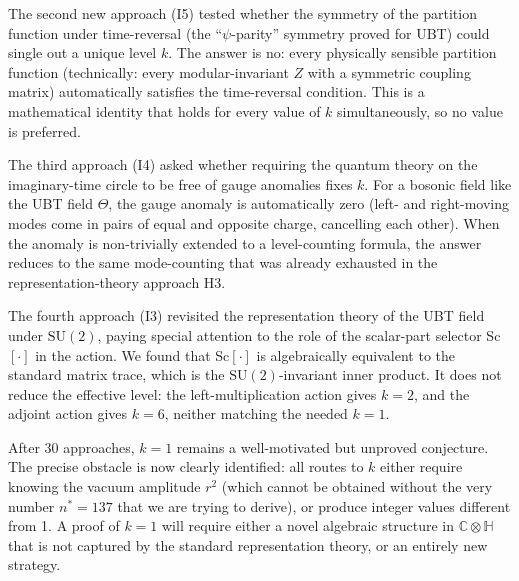 \documentclass[11pt,a4paper]{article}
\theoremstyle{definition}
\theoremstyle{remark}
\begin{document}
The second new approach (I5) tested whether the symmetry of the
partition function under time-reversal (the ``$\psi$-parity'' symmetry
proved for UBT) could single out a unique level $k$.
The answer is no: every physically sensible partition function
(technically: every modular-invariant $Z$ with a symmetric coupling
matrix) automatically satisfies the time-reversal condition.
This is a mathematical identity that holds for every value of $k$
simultaneously, so no value is preferred.

The third approach (I4) asked whether requiring the quantum theory on
the imaginary-time circle to be free of gauge anomalies fixes $k$.
For a bosonic field like the UBT field $\Theta$, the gauge anomaly
is automatically zero (left- and right-moving modes come in pairs
of equal and opposite charge, cancelling each other).
When the anomaly is non-trivially extended to a level-counting
formula, the answer reduces to the same mode-counting that was already
exhausted in the representation-theory approach H3.

The fourth approach (I3) revisited the representation theory of the
UBT field under $\mathrm{SU}(2)$, paying special attention to the
role of the scalar-part selector Sc$[\cdot]$ in the action.
We found that Sc$[\cdot]$ is algebraically equivalent to the standard
matrix trace, which is the $\mathrm{SU}(2)$-invariant inner product.
It does not reduce the effective level: the left-multiplication
action gives $k = 2$, and the adjoint action gives $k = 6$,
neither matching the needed $k = 1$.

After 30 approaches, $k = 1$ remains a well-motivated but unproved
conjecture.
The precise obstacle is now clearly identified: all routes to $k$
either require knowing the vacuum amplitude $r^2$
(which cannot be obtained without the very number $n^* = 137$
that we are trying to derive), or produce integer values different
from 1.
A proof of $k = 1$ will require either a novel algebraic structure
in $\mathbb{C}\otimes\mathbb{H}$ that is not captured by the standard
representation theory, or an entirely new strategy.

\ifdefined\INCLUDEMODE\else
\end{document}
